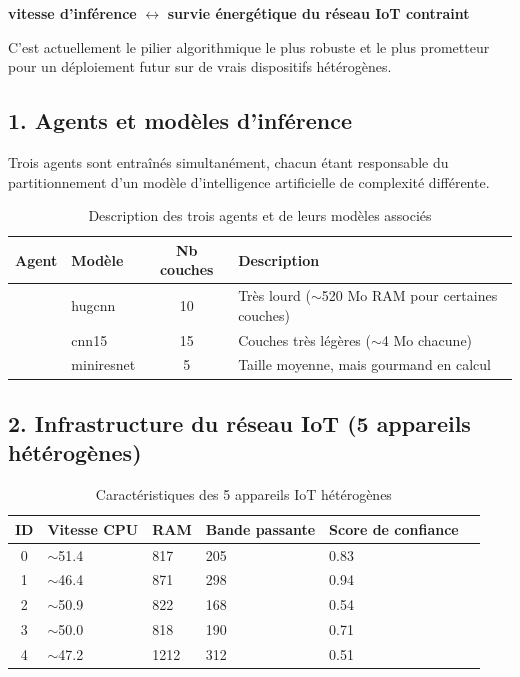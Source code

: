 \documentclass{article}
\begin{document}
\begin{center}
    \large
    \textbf{vitesse d’inférence} \quad $\longleftrightarrow$ \quad \textbf{survie énergétique du réseau IoT contraint}
\end{center}

\bigskip

C’est actuellement le pilier algorithmique le plus robuste et le plus prometteur pour un déploiement futur sur de vrais dispositifs hétérogènes.

\subsection{1. Agents et modèles d'inférence}

Trois agents sont entraînés simultanément, chacun étant responsable du partitionnement d’un modèle d’intelligence artificielle de complexité différente.

\begin{table}[ht]
\centering
\renewcommand{\arraystretch}{1.3}
\begin{tabular}{>{\ttfamily}l l c l}
\toprule
Agent & Modèle & Nb couches & Description \\
\midrule
0     & hugcnn     & 10  & Très lourd ($\sim$520 Mo RAM pour certaines couches) \\
1     & cnn15      & 15  & Couches très légères ($\sim$4 Mo chacune) \\
2     & miniresnet & 5   & Taille moyenne, mais gourmand en calcul \\
\bottomrule
\end{tabular}
\caption{Description des trois agents et de leurs modèles associés}
\label{tab:agents}
\end{table}

\subsection{2. Infrastructure du réseau IoT (5 appareils hétérogènes)}

\begin{table}[ht]
\centering
\small
\renewcommand{\arraystretch}{1.25}
\begin{tabular}{clllll}
\toprule
ID & Vitesse CPU & RAM & Bande passante & Score de confiance \\
\midrule
0  & $\sim$51.4  & 817      & 205                   & 0.83             \\
1  & $\sim$46.4  & 871      & 298                   & 0.94 \\
2  & $\sim$50.9  & 822      & 168                   & 0.54   \\
3  & $\sim$50.0  & 818      & 190                   & 0.71    \\
4  & $\sim$47.2  & 1212     & 312                   & 0.51  \\
\bottomrule
\end{tabular}
\caption{Caractéristiques des 5 appareils IoT hétérogènes}
\label{tab:iot-devices}
\end{table}
\end{document}
